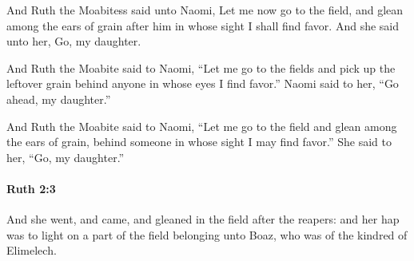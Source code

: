 			\begin{versebox}
					\item[BHS] 
					\item[LXX] 
					\item[ASV] And Ruth the Moabitess said unto Naomi, Let me now go to the field, and glean among the ears of grain after him in whose sight I shall find favor. And she said unto her, Go, my daughter.
					\item[NIV] And Ruth the Moabite said to Naomi, “Let me go to the fields and pick up the leftover grain behind anyone in whose eyes I find favor.” Naomi said to her, “Go ahead, my daughter.”
					\item[NRSV] And Ruth the Moabite said to Naomi, “Let me go to the field and glean among the ears of grain, behind someone in whose sight I may find favor.” She said to her, “Go, my daughter.”
			\end{versebox}

		\paragraph{Ruth 2:3} %
			\label{RUTH-2-3}

			And she went, and came, and gleaned in the field after the reapers: and her hap was to light on a part of the field belonging unto Boaz, who was of the kindred of Elimelech.

